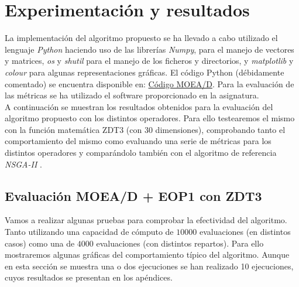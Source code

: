 \begin{minipage}[H]{0.5\linewidth}
\section{Experimentación y resultados}
\justify

La implementación del algoritmo propuesto se ha llevado a cabo utilizado el lenguaje \textit{Python} haciendo uso de las librerías \textit{Numpy}, para el manejo de vectores y matrices, \textit{os} y \textit{shutil} para el manejo de los ficheros y directorios, y \textit{matplotlib} y \textit{colour} para algunas representaciones gráficas. El código Python (débidamente comentado) se encuentra disponible en: \href{https://github.com/vicramgon/EV_BIII.git}{\color{blue} Código MOEA/D}. Para la evaluación de las métricas se ha utilizado el software proporcionado en la asignatura. \\

A continuación se muestran los resultados obtenidos para la evaluación del algoritmo propuesto con los distintos operadores. Para ello testearemos el mismo con la función matemática ZDT3 (con 30 dimensiones)\cite{zdt3}, comprobando tanto el comportamiento del mismo como evaluando una serie de métricas para los distintos operadores y comparándolo también con el algoritmo de referencia \textit{NSGA-II} \cite{Deb2002}.\\

\subsection{Evaluación MOEA/D + EOP1 con ZDT3}

Vamos a realizar algunas pruebas para comprobar la efectividad del algoritmo. Tanto utilizando una capacidad de cómputo de $10000$ evaluaciones (en distintos casos) como una de $4000$ evaluaciones (con distintos repartos). Para ello mostraremos algunas gráficas del comportamiento típico del algoritmo. Aunque en esta sección se muestra una o dos ejecuciones se han realizado 10 ejecuciones, cuyos resultados se presentan en los apéndices.\\


\end{minipage} \hfill
